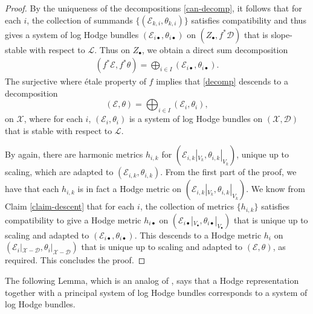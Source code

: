\documentclass[a4paper]{amsart}
\theoremstyle{definition}
\begin{document}
\begin{proof}
By the uniqueness of the decompositions \ref{can-decomp}, it follows that for each $i$, the collection of summands $\{(\mathcal{E}_{k,i},\theta_{k,i})\}$ satisfies compatibility and thus gives a system of log Hodge bundles $(\mathcal{E}_{i\bullet},\theta_{i\bullet})$ on $(Z_\bullet,f^*\mathscr{D})$ that is slope-stable with respect to $\mathcal{L}$. Thus on $Z_\bullet$, we obtain a direct sum decomposition 
\begin{align}\label{decomp}
(f^*\mathcal{E},f^*\theta)=\bigoplus_{i\in I}(\mathcal{E}_{i\bullet},\theta_{i\bullet}).
\end{align}
The surjective where \'etale property of $f$ implies that \ref{decomp} descends to a decomposition 
\[
(\mathcal{E},\theta)=\bigoplus_{i\in I}(\mathcal{E}_i,\theta_i),
\]
on $\mathscr{X}$, where for each $i$, $(\mathcal{E}_i,\theta_i)$ is a system of log Hodge bundles on $(\mathscr{X},\mathscr{D})$ that is stable with respect to $\mathcal{L}$.

By \cite[Theorem 9.4]{mochizuki_asterisque} again, there are harmonic metrics $h_{i,k}$ for $(\mathcal{E}_{i,k}|_{V_k},\theta_{i,k}|_{V_k})$, unique up to scaling, which are adapted to $(\mathcal{E}_{i,k},\theta_{i,k})$. From the first part of the proof, we have that each $h_{i,k}$ is in fact a Hodge metric on $(\mathcal{E}_{i,k}|_{V_k},\theta_{i,k}|_{V_k})$. We know from Claim \ref{claim-descent} that for each $i$, the collection of metrics $\{h_{i,k}\}$ satisfies compatibility to give a Hodge metric $h_{i\bullet}$ on $(\mathcal{E}_{i\bullet}|_{V_\bullet},\theta_{i\bullet}|_{V_\bullet})$ that is unique up to scaling and adapted to $(\mathcal{E}_{i\bullet},\theta_{i\bullet})$. This descends to a Hodge metric $h_i$ on $(\mathcal{E}_i|_{\mathscr{X}-\mathscr{D}},\theta_i|_{\mathscr{X}-\mathscr{D}})$ that is unique up to scaling and adapted to $(\mathcal{E},\mathcal{\theta})$, as required.
This concludes the proof.
\end{proof}

The following Lemma, which is an analog of \cite[Lemma 3.10]{dengcadorel}, says that a Hodge representation together with a principal system of log Hodge bundles corresponds to a system of log Hodge bundles. 
\end{document}

